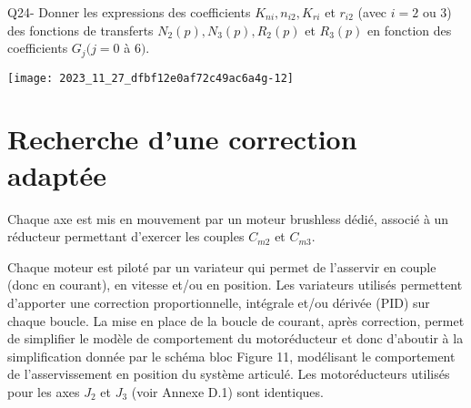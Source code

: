 Q24- Donner les expressions des coefficients $K_{n i}, n_{i 2}, K_{r i}$ et $r_{i 2}$ (avec $i=2$ ou 3) des fonctions de transferts $N_{2}(p), N_{3}(p), R_{2}(p)$ et $R_{3}(p)$ en fonction des coefficients $G_{j}(j=0$ à 6$)$.

\begin{center}
\texttt{[image: 2023\_11\_27\_dfbf12e0af72c49ac6a4g-12]}
\end{center}

\section*{Recherche d'une correction adaptée}
Chaque axe est mis en mouvement par un moteur brushless dédié, associé à un réducteur permettant d'exercer les couples $C_{m 2}$ et $C_{m 3}$.

Chaque moteur est piloté par un variateur qui permet de l'asservir en couple (donc en courant), en vitesse et/ou en position. Les variateurs utilisés permettent d'apporter une correction proportionnelle, intégrale et/ou dérivée (PID) sur chaque boucle. La mise en place de la boucle de courant, après correction, permet de simplifier le modèle de comportement du motoréducteur et donc d'aboutir à la simplification donnée par le schéma bloc Figure 11, modélisant le comportement de l'asservissement en position du système articulé. Les motoréducteurs utilisés pour les axes $J_{2}$ et $J_{3}$ (voir Annexe D.1) sont identiques.


